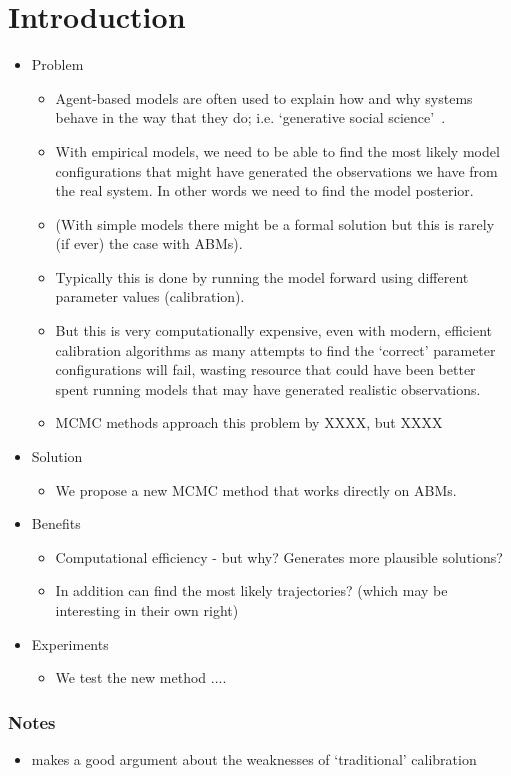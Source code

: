 \section{Introduction}

\begin{itemize}
	\item Problem
	\begin{itemize}
		\item Agent-based models are often used to explain how and why systems behave in the way that they do; i.e. `generative social science'~\cite{epstein_agentbased_1999}.
		\item With empirical models, we need to be able to find the most likely model configurations that might have generated the observations we have from the real system. In other words we need to find the model posterior. 
		\item (With simple models there might be a formal solution but this is rarely (if ever) the case with ABMs).
		\item Typically this is done by running the model forward using different parameter values (calibration).
		\item But this is very computationally expensive, even with modern, efficient calibration algorithms \cite{thiele_facilitating_2014} as many attempts to find the `correct' parameter configurations will fail, wasting resource that could have been better spent running models that may have generated realistic observations.
		\item MCMC methods approach this problem by XXXX, but XXXX
	\end{itemize}
	\item Solution
	\begin{itemize}
		\item We propose a new MCMC method that works directly on ABMs.
	\end{itemize}
	\item Benefits 
	\begin{itemize}
		\item Computational efficiency - but why? Generates more plausible solutions?
		\item In addition can find the most likely trajectories? (which may be interesting in their own right)
	\end{itemize}
	\item Experiments
	\begin{itemize}
		\item We test the new method .... 
	\end{itemize}
\end{itemize}

\subsubsection*{Notes}

\begin{itemize}
	\item \cite{kennedy_bayesian_2001} makes a good argument about the weaknesses of `traditional' calibration
\end{itemize}